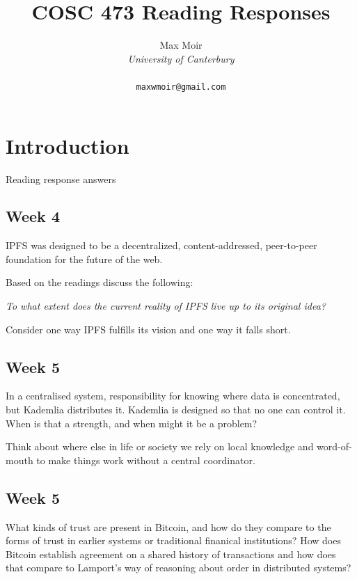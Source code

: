 \documentclass{article}
\title{COSC 473 Reading Responses}
\author{
    Max Moir \\
    \textit{University of Canterbury} \\ 
    \text{Christchurch, New Zealand} \\ 
    \texttt{maxwmoir@gmail.com}
}
\theoremstyle{definition}
\begin{document}
\maketitle

\section{Introduction}

Reading response answers

\subsection{Week 4}
IPFS was designed to be a decentralized, content-addressed, peer-to-peer foundation for the future of the web.

\noindent
Based on the readings discuss the following:

\noindent
\emph{To what extent does the current reality of IPFS live up to its original idea?}

\noindent
Consider one way IPFS fulfills its vision and one way it falls short.

\subsection{Week 5}
In a centralised system, responsibility for knowing where data is concentrated, but Kademlia distributes it.
Kademlia is designed so that no one can control it. When is that a strength, and when might it be a problem?

Think about where else in life or society we rely on local knowledge and word-of-mouth to make things work without a central coordinator.

\subsection{Week 5}

What kinds of trust are present in Bitcoin, and how do they compare to the forms of trust in earlier systems or traditional finanical institutions?
How does Bitcoin establish agreement on a shared history of transactions and how does that compare to Lamport's way of reasoning about order in distributed systems?
\end{document}
